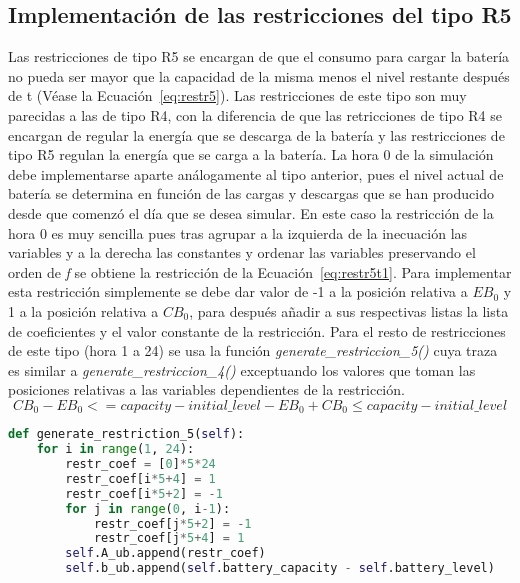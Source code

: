 \subsection{Implementación de las restricciones del tipo R5}
Las restricciones de tipo R5 se encargan de que el consumo para cargar la batería no pueda ser mayor que la capacidad de la misma menos el nivel restante después de t (Véase la Ecuación~\ref{eq:restr5}). Las restricciones de este tipo son muy parecidas a las de tipo R4, con la diferencia de que las retricciones de tipo R4 se encargan de regular la energía que se descarga de la batería y las restricciones de tipo R5 regulan la energía que se carga a la batería. La hora 0 de la simulación debe implementarse aparte análogamente al tipo anterior, pues el nivel actual de batería se determina en función de las cargas y descargas que se han producido desde que comenzó el día que se desea simular. En este caso la restricción de la hora 0 es muy sencilla pues tras agrupar a la izquierda de la inecuación las variables y a la derecha las constantes y ordenar las variables preservando el orden de \textit{f} se obtiene la restricción de la Ecuación~\ref{eq:restr5t1}. Para implementar esta restricción simplemente se debe dar valor de -1 a la posición relativa a $ EB_{0} $ y 1 a la posición relativa a $ CB_{0} $, para después añadir a sus respectivas listas la lista de coeficientes y el valor constante de la restricción. Para el resto de restricciones de este tipo (hora 1 a 24) se usa la función \textit{generate\_restriccion\_5()} cuya traza es similar a \textit{generate\_restriccion\_4()} exceptuando los valores que toman las posiciones relativas a las variables dependientes de la restricción.
\begin{equation}
  \label{eq:restr5t1}
  CB_{0} - EB_{0} <= capacity - initial\_level
  -EB_{0} + CB_{0} \leq capacity - initial\_level
\end{equation}
\begin{lstlisting}[language=Python,float=ht,caption={Restricciones del tipo R5},label={lst:restr5}]
def generate_restriction_5(self):
    for i in range(1, 24):
        restr_coef = [0]*5*24
        restr_coef[i*5+4] = 1
        restr_coef[i*5+2] = -1
        for j in range(0, i-1):
            restr_coef[j*5+2] = -1
            restr_coef[j*5+4] = 1
        self.A_ub.append(restr_coef)
        self.b_ub.append(self.battery_capacity - self.battery_level)
\end{lstlisting}
